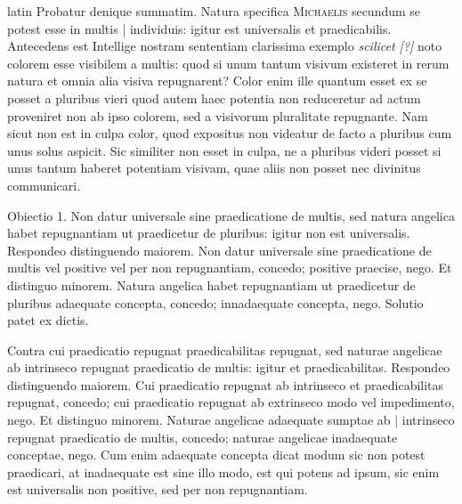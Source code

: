 \begin{otherlanguage*}{latin}
\pstart
 Probatur denique summatim. Natura specifica \textsc{Michaelis}\index[persons]{} secundum se potest esse in multis \textnormal{|} individuis: igitur est universalis et praedicabilis. Antecedens est  Intellige nostram sententiam clarissima exemplo \emph{scilicet [?]}  noto colorem esse visibilem a multis: quod si unum tantum visivum existeret in rerum natura et omnia alia visiva repugnarent? Color enim ille quantum esset ex se posset a pluribus vieri quod autem haec potentia non reduceretur ad actum proveniret non ab ipso colorem, sed a visivorum pluralitate repugnante. Nam sicut non est in culpa color, quod expositus non videatur de facto a pluribus cum unus solus aspicit. Sic similiter non esset in culpa, ne a pluribus videri posset si unus tantum haberet potentiam visivam, quae aliis non posset nec divinitus communicari. 
\pend

\pstart
 Obiectio 1. Non datur universale sine praedicatione de multis, sed natura angelica habet repugnantiam ut praedicetur de pluribus: igitur non est universalis. Respondeo distinguendo maiorem. Non datur universale sine praedicatione de multis vel positive vel per non repugnantiam, concedo; positive praecise, nego. Et distinguo minorem. Natura angelica habet repugnantiam ut praedicetur de pluribus adaequate concepta, concedo; innadaequate concepta, nego. Solutio patet ex dictis. 
\pend

\pstart
 Contra cui praedicatio repugnat praedicabilitas repugnat, sed naturae angelicae ab intrinseco repugnat praedicatio de multis: igitur et praedicabilitas. Respondeo distinguendo maiorem. Cui praedicatio repugnat ab intrinseco et praedicabilitas repugnat, concedo; cui praedicatio repugnat ab extrinseco modo vel impedimento, nego. Et distinguo minorem. Naturae angelicae adaequate sumptae ab \textnormal{|}   intrinseco repugnat praedicatio de multis, concedo; naturae angelicae inadaequate conceptae, nego. Cum enim adaequate concepta dicat modum sic non potest praedicari, at inadaequate est sine illo modo, est qui potens ad ipsum, sic enim est universalis non positive, sed per non repugnantiam. 
\pend


\end{otherlanguage*}
